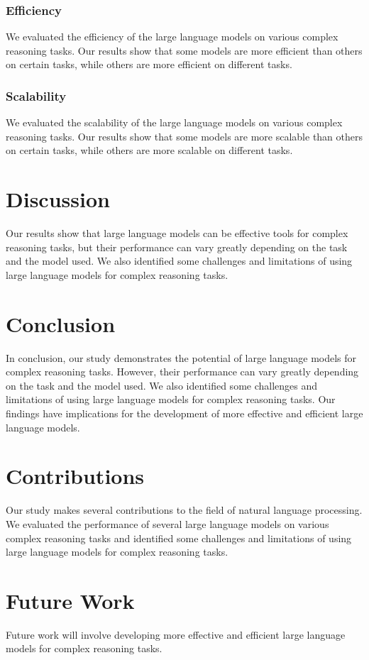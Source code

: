 \documentclass{article}
\begin{document}
\subsubsection{Efficiency}
We evaluated the efficiency of the large language models on various complex reasoning tasks. Our results show that some models are more efficient than others on certain tasks, while others are more efficient on different tasks.

\subsubsection{Scalability}
We evaluated the scalability of the large language models on various complex reasoning tasks. Our results show that some models are more scalable than others on certain tasks, while others are more scalable on different tasks.

\section{Discussion}
Our results show that large language models can be effective tools for complex reasoning tasks, but their performance can vary greatly depending on the task and the model used. We also identified some challenges and limitations of using large language models for complex reasoning tasks.

\section{Conclusion}
In conclusion, our study demonstrates the potential of large language models for complex reasoning tasks. However, their performance can vary greatly depending on the task and the model used. We also identified some challenges and limitations of using large language models for complex reasoning tasks. Our findings have implications for the development of more effective and efficient large language models.

\section{Contributions}
Our study makes several contributions to the field of natural language processing. We evaluated the performance of several large language models on various complex reasoning tasks and identified some challenges and limitations of using large language models for complex reasoning tasks.

\section{Future Work}
Future work will involve developing more effective and efficient large language models for complex reasoning tasks.
\end{document}

